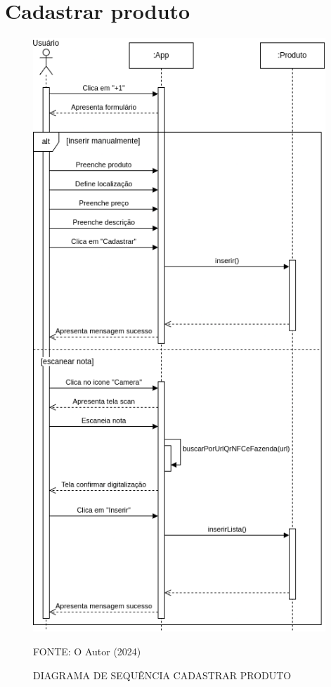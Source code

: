 \section{Cadastrar produto}
\begin{figure}[H]
    \caption{\label{fig:seqcadprod} DIAGRAMA DE SEQUÊNCIA CADASTRAR PRODUTO}
    \includegraphics[width = 110mm]{fig/sequencia/sequencia2.png}
    \footnotesize \centering
    \par FONTE: O Autor (2024)
\end{figure}



